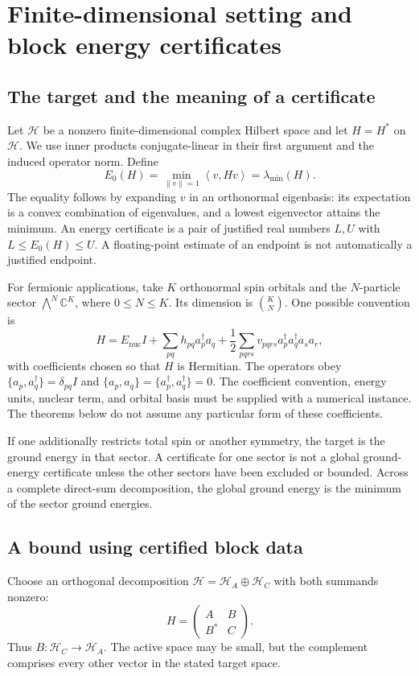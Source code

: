 \documentclass[11pt,a4paper]{article}
\theoremstyle{plain}
\theoremstyle{definition}
\theoremstyle{remark}
\newcommand{\norm}[1]{\left\lVert #1\right\rVert}
\newcommand{\ip}[2]{\left\langle #1,#2\right\rangle}
\newcommand{\C}{\mathbb{C}}
\begin{document}
\section{Finite-dimensional setting and block energy certificates}
\label{sec:energy}
\subsection{The target and the meaning of a certificate}
Let $\mathcal H$ be a nonzero finite-dimensional complex Hilbert space and
let $H=H^*$ on $\mathcal H$. We use inner products conjugate-linear in their
first argument and the induced operator norm. Define
\[
 E_0(H)=\min_{\norm{v}=1}\ip{v}{Hv}=\lambda_{\min}(H).
\]
The equality follows by expanding $v$ in an orthonormal eigenbasis: its
expectation is a convex combination of eigenvalues, and a lowest eigenvector
attains the minimum. An energy certificate is a pair of justified real
numbers $L,U$ with $L\le E_0(H)\le U$. A floating-point estimate of an
endpoint is not automatically a justified endpoint.

For fermionic applications, take $K$ orthonormal spin orbitals and the
$N$-particle sector $\bigwedge^N\C^K$, where $0\le N\le K$.
Its dimension is $\binom K N$. One possible convention is
\begin{equation}
 H=E_{\mathrm{nuc}}I+\sum_{pq}h_{pq}a_p^\dagger a_q
   +\frac12\sum_{pqrs}v_{pqrs}a_p^\dagger a_q^\dagger a_s a_r,
 \label{eq:electronic}
\end{equation}
with coefficients chosen so that $H$ is Hermitian. The operators obey
$\{a_p,a_q^\dagger\}=\delta_{pq}I$ and
$\{a_p,a_q\}=\{a_p^\dagger,a_q^\dagger\}=0$.
The coefficient convention, energy units, nuclear term, and orbital basis
must be supplied with a numerical instance. The theorems below do not assume
any particular form of these coefficients.

If one additionally restricts total spin or another symmetry, the target is
the ground energy in that sector. A certificate for one sector is not a
global ground-energy certificate unless the other sectors have been excluded
or bounded. Across a complete direct-sum decomposition, the global ground
energy is the minimum of the sector ground energies.

\subsection{A bound using certified block data}
Choose an orthogonal decomposition
$\mathcal H=\mathcal H_A\oplus\mathcal H_C$ with both summands nonzero:
\begin{equation}
 H=\begin{pmatrix} A&B\\B^*&C\end{pmatrix}.
 \label{eq:block}
\end{equation}
Thus $B:\mathcal H_C\to\mathcal H_A$. The active space may be small,
but the complement comprises every other vector in the stated target space.
\end{document}
